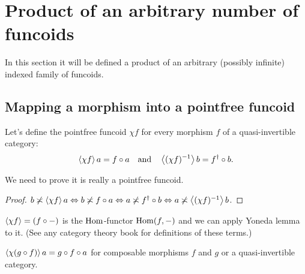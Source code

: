 \section{Product of an arbitrary number of funcoids}

In this section it will be defined a product of an arbitrary (possibly
infinite) indexed family of funcoids.


\subsection{Mapping a morphism into a pointfree funcoid}
\begin{defn}
Let's define the pointfree funcoid $\chi f$ for every morphism $f$
of a quasi-invertible category: 
\[
\left\langle \chi f\right\rangle a=f\circ a\quad\text{and}\quad\left\langle (\chi f)^{-1}\right\rangle b=f^{\dagger}\circ b.
\]

\end{defn}
We need to prove it is really a pointfree funcoid.
\begin{proof}
$b\not\asymp\left\langle \chi f\right\rangle a\Leftrightarrow b\not\asymp f\circ a\Leftrightarrow a\not\asymp f^{\dagger}\circ b\Leftrightarrow a\not\asymp\left\langle (\chi f)^{-1}\right\rangle b$.\end{proof}
\begin{rem}
$\left\langle \chi f\right\rangle=(f\circ-)$ is the $\operatorname{Hom}$-functor
$\operatorname{Hom}(f,-)$ and we can apply Yoneda lemma to it. (See any category
theory book for definitions of these terms.)\end{rem}
\begin{obvious}
$\left\langle \chi(g\circ f)\right\rangle a=g\circ f\circ a$ for composable morphisms
$f$ and $g$ or a quasi-invertible category.
\end{obvious}

